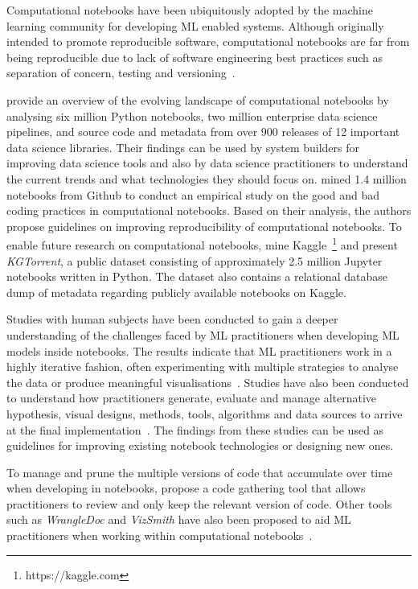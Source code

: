 \documentclass[conference]{IEEEtran}
\begin{document}
Computational notebooks have been ubiquitously adopted by the machine learning community for developing ML enabled systems. Although originally intended to promote reproducible software, computational notebooks are far from being reproducible due to lack of software engineering best practices such as separation of concern, testing and versioning~\cite{pimentel2019large}.

\cite{psallidas2019data} provide an overview of the evolving landscape of computational notebooks by analysing six million Python notebooks, two million enterprise data science pipelines, and source code and metadata from over 900 releases of 12 important data science libraries. Their findings can be used by system builders for improving data science tools and also by data science practitioners to understand the current trends and what technologies they should focus on. \cite{pimentel2019large} mined 1.4 million notebooks from Github to conduct an empirical study on the good and bad coding practices in computational notebooks. Based on their analysis, the authors propose guidelines on improving reproducibility of computational notebooks. To enable future research on computational notebooks, \cite{quaranta2021kgtorrent} mine Kaggle~\footnote{https://kaggle.com} and present \textit{KGTorrent}, a public dataset consisting of approximately 2.5 million Jupyter notebooks written in Python. The dataset also contains a relational database dump of metadata regarding publicly available notebooks on Kaggle.

Studies with human subjects have been conducted to gain a deeper understanding of the challenges faced by ML practitioners when developing ML models inside notebooks. The results indicate that ML practitioners work in a highly iterative fashion, often experimenting with multiple strategies to analyse the data or produce meaningful visualisations~\cite{kandel2012enterprise, kery2018story, liu2019understanding, chattopadhyay2020wrong}. Studies have also been conducted to understand how practitioners generate, evaluate and manage alternative hypothesis, visual designs, methods, tools, algorithms and data sources to arrive at the final implementation~\cite{liu2019understanding,kandel2012enterprise}. The findings from these studies can be used as guidelines for improving existing notebook technologies or designing new ones.

To manage and prune the multiple versions of code that accumulate over time when developing in notebooks, \cite{head2019managing} propose a code gathering tool that allows practitioners to review and only keep the relevant version of code. Other tools such as \textit{WrangleDoc} and \textit{VizSmith} have also been proposed to aid ML practitioners when working within computational notebooks~\cite{yang2021subtle, bavishi2021vizsmith}.
\end{document}
